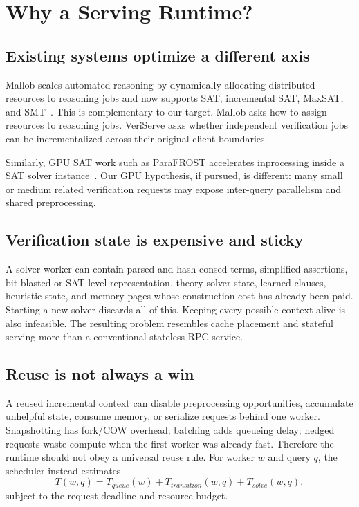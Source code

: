 \documentclass[10pt,twocolumn]{article}
\begin{document}
\section{Why a Serving Runtime?}
\subsection{Existing systems optimize a different axis}
Mallob scales automated reasoning by dynamically allocating distributed resources to reasoning jobs and now supports SAT, incremental SAT, MaxSAT, and SMT~\cite{schreiber2026mallob,sanders2022mallob}. This is complementary to our target. Mallob asks how to assign resources to reasoning jobs. VeriServe asks whether independent verification jobs can be incrementalized across their original client boundaries.

Similarly, GPU SAT work such as ParaFROST accelerates inprocessing inside a SAT solver instance~\cite{osama2024parafrost}. Our GPU hypothesis, if pursued, is different: many small or medium related verification requests may expose inter-query parallelism and shared preprocessing.

\subsection{Verification state is expensive and sticky}
A solver worker can contain parsed and hash-consed terms, simplified assertions, bit-blasted or SAT-level representation, theory-solver state, learned clauses, heuristic state, and memory pages whose construction cost has already been paid. Starting a new solver discards all of this. Keeping every possible context alive is also infeasible. The resulting problem resembles cache placement and stateful serving more than a conventional stateless RPC service.

\subsection{Reuse is not always a win}
A reused incremental context can disable preprocessing opportunities, accumulate unhelpful state, consume memory, or serialize requests behind one worker. Snapshotting has fork/COW overhead; batching adds queueing delay; hedged requests waste compute when the first worker was already fast. Therefore the runtime should not obey a universal reuse rule. For worker $w$ and query $q$, the scheduler instead estimates
\begin{equation}
T(w,q)=T_{queue}(w)+T_{transition}(w,q)+T_{solve}(w,q),
\end{equation}
subject to the request deadline and resource budget.
\end{document}
